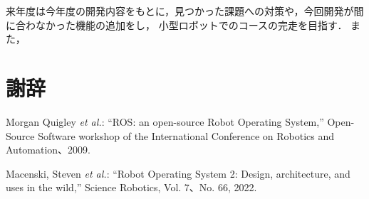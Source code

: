 \documentclass[twocolumn,9pt]{jsproceedings}
\begin{document}
来年度は今年度の開発内容をもとに，見つかった課題への対策や，今回開発が間に合わなかった機能の追加をし，
小型ロボットでのコースの完走を目指す．
また，




\section*{謝辞}

\footnotesize
\begin{thebibliography}{99}
  Morgan Quigley {\it et al.}: ``ROS: an open-source Robot Operating System,''
  Open-Source Software workshop of the International Conference on Robotics and Automation、2009.

  Macenski, Steven {\it et al.}: ``Robot Operating System 2: Design, architecture, and uses in the wild,''
  Science Robotics, Vol. 7、No. 66, 2022.










\end{thebibliography}
\end{document}

